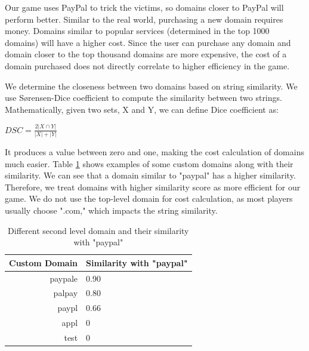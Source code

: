 Our game uses PayPal to trick the victims, so domains closer to PayPal will perform better. Similar to the real world, purchasing a new domain requires money. Domains similar to popular services (determined in the top 1000 domains) will have a higher cost. Since the user can purchase any domain and domain closer to the top thousand domains are more expensive,  the cost of a domain purchased does not directly correlate to higher efficiency in the game.

We determine the closeness between two domains based on string similarity. We use Sørensen-Dice coefficient to compute the similarity between two strings. Mathematically, given two sets, X and Y, we can define Dice coefficient as:

\begin{center}
    \begin{math}
        DSC = \frac{2|X \cap Y|}{|X|+|Y|}
    \end{math}
\end{center}

It produces a value between zero and one, making the cost calculation of domains much easier. Table \ref{tab:dice} shows examples of some custom domains along with their similarity. We can see that a domain similar to "paypal" has a higher similarity. Therefore, we treat domains with higher similarity score as more efficient for our game. We do not use the top-level domain for cost calculation, as most players usually choose ".com," which impacts the string similarity.

\begin{table}[!ht]
    \centering
    \begin{tabular}{r|l}
        \textbf{Custom Domain} & \textbf{Similarity with "paypal"} \\
        \hline
        paypale                & 0.90                              \\
        palpay                 & 0.80                              \\
        paypl                  & 0.66                              \\
        appl                   & 0                                 \\
        test                   & 0                                 \\
    \end{tabular}
    \caption{Different second level domain and their similarity with "paypal"}
    \label{tab:dice}
\end{table}

